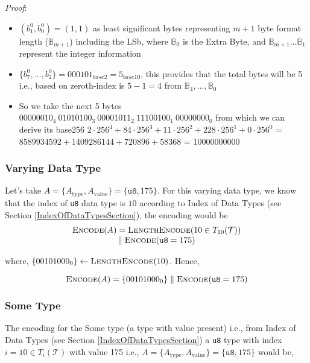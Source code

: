 \documentclass[../alan-handbook.tex]{subfiles}
\begin{document}
\textit{Proof}: 
\begin{itemize}
\item $(b_1^0,b_0^0)=(1,1)$ as least significant bytes representing $m+1$ byte format length ($\mathbb{B}_{m+1}$) including the LSb, where $\mathbb{B}_0$ is the Extra Byte, and $\mathbb{B}_{m+1}\ldots \mathbb{B}_{1}$ represent the integer information
\item $\{b^0_7,\ldots,b^0_2\} = 000101_{base2} = 5_{base10}$, this provides that the total bytes will be 5 i.e., based on zeroth-index is $5-1=4$ from $\mathbb{B}_{4},\ldots,\mathbb{B}_0$
\item So we take the next 5 bytes $00000010_4 \ 01010100_3 \ 00001011_2 \ 11100100_1 \ 00000000_0$ from which we can derive its base256 $2\cdot 256^4+84\cdot 256^3+11\cdot 256^2+228\cdot 256^1+0\cdot 256^0$ = $8589934592 + 1409286144 + 720896 + 58368$ = $10000000000$
\end{itemize}

\subsubsection{Varying Data Type} \label{Eg:VaryingDataType}

Let's take $A=\{A_{\text{type}},A_{\text{value}}\}=\{\texttt{u8},175\}$. For this varying data type, we know that the index of \texttt{u8} data type is $10$ according to Index of Data Types (see Section \ref{IndexOfDataTypesSection}), the encoding would be 
$$
\begin{matrix}
    \Call{Encode}{A}=\Call{LengthEncode}{10 \in T_{10}(\mathcal{T})} \\ 
    \parallel \Call{Encode}{\texttt{u8}=175}
\end{matrix}
$$

where, $ \{00101000_0\} \gets \Call{LengthEncode}{10}$. Hence, 

$$\Call{Encode}{A} = \{00101000_0\} \parallel \Call{Encode}{\texttt{u8}=175}$$ 

\subsubsection{Some Type} \label{Eg:SomeType}

The encoding for the Some type (a type with value present) i.e., from Index of Data Types (see Section \ref{IndexOfDataTypesSection}) a \texttt{u8} type with index $i=10 \in T_i(\mathcal{T})$ with value 175 i.e., $A=\{A_{\text{type}},A_{\text{value}}\}=\{\texttt{u8},175\}$ would be,
\end{document}
